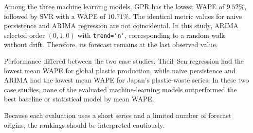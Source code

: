 Among the three machine learning models, GPR has the lowest WAPE of \(9.52\%\), followed by SVR with a WAPE of \(10.71\%\).
The identical metric values for naive persistence and ARIMA regression are not coincidental.
In this study, ARIMA selected order \((0,1,0)\) with \texttt{trend='n'}, corresponding to a random walk without drift. Therefore, its forecast remains at the last observed value.



Performance differed between the two case studies. Theil--Sen regression had the lowest mean WAPE for global plastic production, while naive persistence and ARIMA had the lowest mean WAPE for Japan’s plastic-waste series.
In these two case studies, none of the evaluated machine-learning models outperformed the best baseline or statistical model by mean WAPE.

Because each evaluation uses a short series and a limited number of forecast origins, the rankings should be interpreted cautiously.
